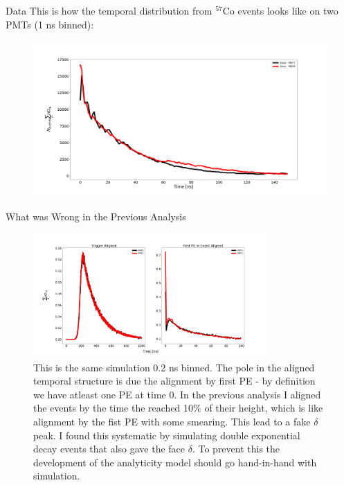 \documentclass{beamer}
\begin{document}
\begin{frame}{Data}
This is how the temporal distribution from $^{57}$Co events looks like on two PMTs (1 ns binned):
\begin{figure}[h]
\includegraphics[width=1\textwidth]{data.png}
\end{figure}
\end{frame}

\begin{frame}{What was Wrong in the Previous Analysis}
\begin{figure}[h]
\includegraphics[width=0.8\textwidth]{sim1000.png}
\caption{This is the same simulation 0.2 ns binned. The pole in the aligned temporal structure is due the alignment by first PE - by definition we have atleast one PE at time 0. In the previous analysis I aligned the events by the time the reached 10$\%$ of their height, which is like alignment by the fist PE with some smearing. This lead to a fake $\delta$ peak. I found this systematic by simulating double exponential decay events that also gave the face $\delta$. To prevent this the development of the analyticity model should go hand-in-hand with simulation.}
\end{figure}
\end{frame}
\end{document}
